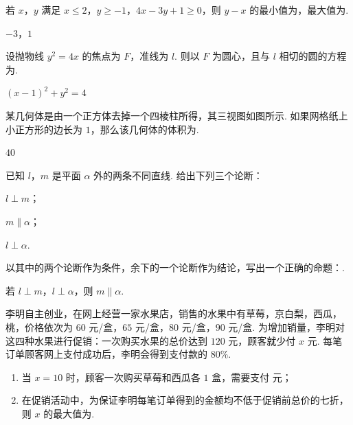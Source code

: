 \begin{problem}
若 \(x\)，\(y\) 满足 \(x\le2\)，\(y\ge-1\)，\(4x-3y+1\ge0\)，则 \(y-x\) 的最小值为\fillinblank{}，最大值为\fillinblank{}.
\end{problem}

\begin{answer}
\(-3\)，\(1\)
\end{answer}

\begin{problem}
设抛物线 \(y^2=4x\) 的焦点为 \(F\)，准线为 \(l\). 则以 \(F\) 为圆心，且与 \(l\) 相切的圆的方程为\fillinblank{}.
\end{problem}

\begin{answer}
\((x-1)^2+y^2=4\)
\end{answer}

\begin{problem}
某几何体是由一个正方体去掉一个四棱柱所得，其三视图如图所示. 如果网格纸上小正方形的边长为 \(1\)，那么该几何体的体积为\fillinblank{}.

\end{problem}

\begin{answer}
\(40\)
\end{answer}

\begin{problem}
已知 \(l\)，\(m\) 是平面 \(\alpha\) 外的两条不同直线. 给出下列三个论断：

\begin{circlelist}
\item \(l\perp m\)；

\item \(m\parallel\alpha\)；

\item \(l\perp \alpha\).
\end{circlelist}

以其中的两个论断作为条件，余下的一个论断作为结论，写出一个正确的命题：\fillinblank{}.
\end{problem}

\begin{answer}
若 \(l\perp m\)，\(l\perp\alpha\)，则 \(m\parallel\alpha\).
\end{answer}

\begin{problem}
李明自主创业，在网上经营一家水果店，销售的水果中有草莓，京白梨，西瓜，桃，价格依次为 \(60\) 元/盒，\(65\) 元/盒，\(80\) 元/盒，\(90\) 元/盒. 为增加销量，李明对这四种水果进行促销：一次购买水果的总价达到 \(120\) 元，顾客就少付 \(x\) 元. 每笔订单顾客网上支付成功后，李明会得到支付款的 \(80\%\).

\begin{enumerate}
\item 当 \(x=10\) 时，顾客一次购买草莓和西瓜各 \(1\) 盒，需要支付\fillinblank{} 元；

\item 在促销活动中，为保证李明每笔订单得到的金额均不低于促销前总价的七折，则 \(x\) 的最大值为\fillinblank{}.
\end{enumerate}
\end{problem}

